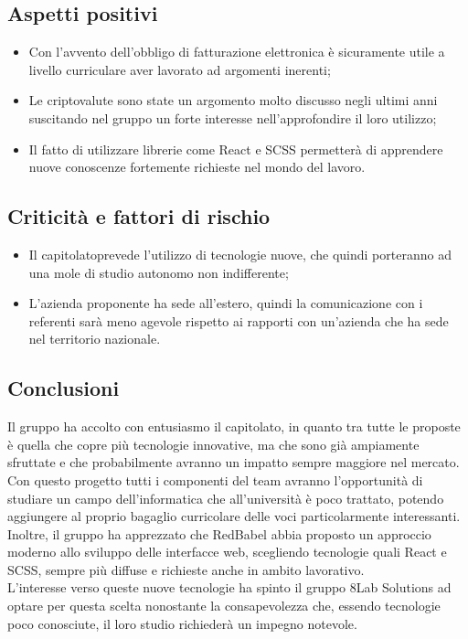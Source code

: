 \subsection{Aspetti positivi}
\begin{itemize}
	\item Con l'avvento dell'obbligo di fatturazione elettronica è sicuramente
	utile a livello curriculare aver lavorato ad argomenti inerenti;
	\item Le criptovalute sono state un argomento molto discusso negli ultimi anni 
suscitando nel gruppo un forte interesse nell'approfondire il loro utilizzo;
	
	\item Il fatto di utilizzare librerie come React e SCSS permetterà di
	apprendere nuove conoscenze fortemente richieste nel mondo del lavoro.
\end{itemize}


\subsection{Criticità  e fattori di rischio}

\begin{itemize}
	\item Il capitolato\glosp prevede l'utilizzo di tecnologie nuove, che quindi 
porteranno ad una mole di studio autonomo non indifferente;
	\item L'azienda proponente ha sede all'estero, quindi la comunicazione con i 
referenti sarà meno agevole rispetto ai rapporti con un'azienda che ha sede nel 
territorio nazionale.
\end{itemize}

\subsection{Conclusioni} Il gruppo ha accolto con entusiasmo il capitolato\glo, in 
quanto tra tutte le proposte è quella che copre più tecnologie innovative, ma 
che sono già ampiamente sfruttate e che probabilmente avranno un impatto sempre 
maggiore nel mercato. Con questo progetto tutti i componenti del team avranno 
l'opportunità di studiare un campo dell'informatica che all'università è poco 
trattato, potendo aggiungere al proprio bagaglio curricolare delle voci 
particolarmente interessanti. Inoltre, il gruppo ha apprezzato che RedBabel abbia
proposto un approccio moderno allo sviluppo delle interfacce web, scegliendo 
tecnologie quali React e SCSS, sempre più diffuse e richieste anche in ambito lavorativo.\\
L'interesse verso queste nuove tecnologie ha spinto il gruppo 8Lab Solutions ad 
optare per questa scelta nonostante la consapevolezza che, essendo tecnologie 
poco conosciute, il loro studio richiederà un impegno notevole.


